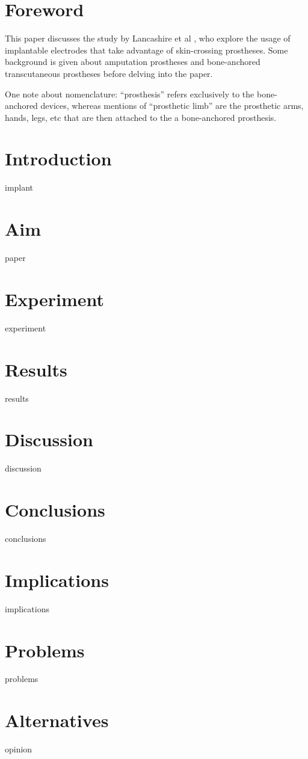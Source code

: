 \documentclass[oneside]{article}
\begin{document}

	\tableofcontents
	\clearpage
{}
\section{Foreword}
This paper discusses the study by Lancashire et al \cite{LancashireHenryT2019HERf}, who explore the usage of implantable electrodes that take advantage of skin-crossing prostheses. Some background is given about amputation prostheses and bone-anchored transcutaneous prostheses before delving into the paper.

One note about nomenclature: ``prosthesis'' refers exclusively to the bone-anchored devices, whereas mentions of ``prosthetic limb'' are the prosthetic arms, hands, legs, etc that are then attached to the a bone-anchored prosthesis.
\section{Introduction}
	{implant}
\section{Aim}
	{paper}
\section{Experiment}
	{experiment}
\section{Results}
	{results}
\section{Discussion}
	{discussion}
\section{Conclusions}
	{conclusions}
\section{Implications}
	{implications}
\section{Problems}
	{problems}
\section{Alternatives}
	{opinion}

	
	
\end{document}
